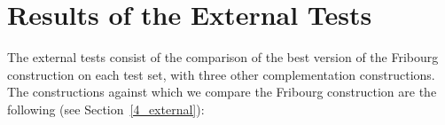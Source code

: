 






\section{Results of the External Tests}
\label{5_external}
The external tests consist of the comparison of the best version of the Fribourg construction on each test set, with three other complementation constructions. The constructions against which we compare the Fribourg construction are the following (see Section~\ref{4_external}):

